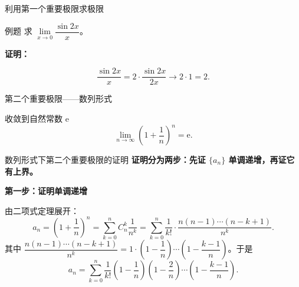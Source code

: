 \documentclass[aspectratio=169,10pt]{ctexbeamer}
\newcommand{\ee}{\mathrm{e}}
\begin{document}
\begin{frame}{利用第一个重要极限求极限}
	\begin{block}{例题}
		求 \(\lim\limits_{x \to 0} \dfrac{\sin 2x}{x}\)。
	\end{block}
	
	\pause
	
	\vspace{0.4cm}
	
	\textbf{证明：}
	
	\[
	\dfrac{\sin 2x}{x} = 2 \cdot \dfrac{\sin 2x}{2x} \to 2 \cdot 1 = 2.
	\]
	
	
	
\end{frame}


\begin{frame}{第二个重要极限——数列形式}
	\normalsize
	\begin{block}{收敛到自然常数 e}
		\[
		\lim\limits_{n\to\infty} \left(1 + \dfrac{1}{n}\right)^n = \ee.
		\]
	\end{block}
	

	
	
\end{frame}


\begin{frame}{数列形式下第二个重要极限的证明}
		\textbf{证明分为两步：先证 \(\{a_n\}\) 单调递增，再证它有上界。}
	
	\noindent\textbf{第一步：证明单调递增}
	
	由二项式定理展开：
	\[
	a_n = \left(1+\dfrac{1}{n}\right)^n = \sum\limits_{k=0}^{n} C_n^k \dfrac{1}{n^k} = \sum_{k=0}^{n} \dfrac{1}{k!} \cdot \dfrac{n(n-1)\cdots(n-k+1)}{n^k}.
	\]
	其中 \(\dfrac{n(n-1)\cdots(n-k+1)}{n^k} = 1 \cdot \left(1-\dfrac{1}{n}\right) \cdots \left(1-\dfrac{k-1}{n}\right)\)。于是
	\[
	a_n = \sum_{k=0}^{n} \dfrac{1}{k!} \left(1-\dfrac{1}{n}\right)\left(1-\dfrac{2}{n}\right)\cdots\left(1-\dfrac{k-1}{n}\right).
	\]
\end{frame}
\end{document}

